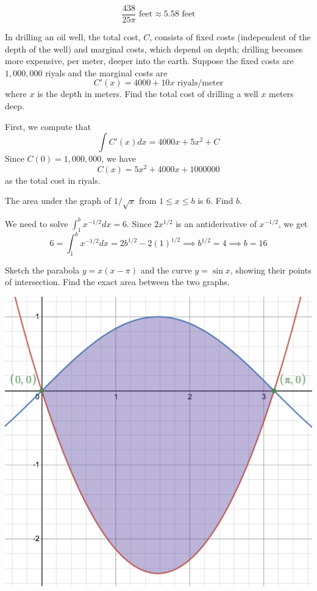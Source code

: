 \documentclass[11pt]{exam}
\begin{document}
\begin{questions}
\begin{solution}
\[        \frac{438}{25 \pi} \text{ feet} \approx 5.58 \text{ feet}
      \]
    \end{solution}
  \question In drilling an oil well, the total cost, \(C\), consists
    of fixed costs (independent of the depth of the well) and marginal
    costs, which depend on depth; drilling becomes more expensive, per
    meter, deeper into the earth. Suppose the fixed costs are
    \(1,000,000\) riyals and the marginal costs are \[
      C'(x) = 4000 + 10x \text{ riyals/meter}
    \]
    where \(x\) is the depth in meters. Find the total cost of
    drilling a well \(x\) meters deep.
    \begin{solution}
      First, we compute that \[
        \int C'(x) dx = 4000x + 5 x^2 + C
      \]
      Since \(C(0) = 1,000,000\), we have \[
        C(x) = 5x^2 + 4000x + 1000000
      \]
      as the total cost in riyals.
    \end{solution}
  \question The area under the graph of $1/\sqrt{x}$ from $1\leq x \leq b$ is 6.  Find $b$.
    \begin{solution}
      We need to solve \(\int_1^b x^{-1/2} dx = 6\). Since \(2
      x^{1/2}\) is an antiderivative of \(x^{-1/2}\), we get \[
        6 = \int_1^b x^{-1/2} dx = 2 b^{1/2} - 2(1)^{1/2} \implies
        b^{1/2} = 4 \implies b = 16
      \]
    \end{solution}
  \question Sketch the parabola \(y=x(x-\pi)\) and the curve \(y=\sin
    x\), showing their points of intersection. Find the exact area
    between the two graphs.
    \begin{solution}
      \includegraphics[scale=0.5]{Figures/9}


\end{solution}
\end{questions}
\end{document}

